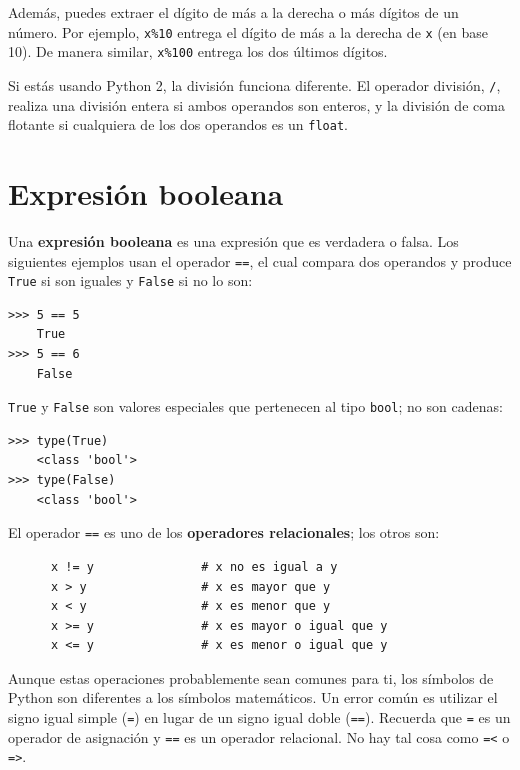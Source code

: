\documentclass[10pt]{book}
\begin{document}
Además, puedes extraer el dígito de más a la derecha
o más dígitos de un número.  Por ejemplo, {\tt x\%10} entrega el
dígito de más a la derecha de {\tt x} (en base 10).  De manera similar, {\tt x\%100}
entrega los dos últimos dígitos.

Si estás usando Python 2, la división funciona diferente.  El
operador división, \verb"/", realiza una división entera si ambos
operandos son enteros, y la división de coma flotante si cualquiera de
los dos operandos es un {\tt float}.


\section{Expresión booleana}

Una {\bf expresión booleana} es una expresión que es verdadera
o falsa.  Los siguientes ejemplos usan el
operador {\tt ==}, el cual compara dos operandos y produce
{\tt True} si son iguales y {\tt False} si no lo son:

\begin{verbatim}
>>> 5 == 5
    True
>>> 5 == 6
    False
\end{verbatim}
%
{\tt True} y {\tt False} son valores
especiales que pertenecen al tipo {\tt bool}; no son cadenas:

\begin{verbatim}
>>> type(True)
    <class 'bool'>
>>> type(False)
    <class 'bool'>
\end{verbatim}
%
El operador {\tt ==} es uno de los {\bf operadores relacionales}; los
otros son:

\begin{verbatim}
      x != y               # x no es igual a y
      x > y                # x es mayor que y
      x < y                # x es menor que y
      x >= y               # x es mayor o igual que y
      x <= y               # x es menor o igual que y
\end{verbatim}
%
Aunque estas operaciones probablemente sean comunes para ti, los símbolos de Python
son diferentes a los símbolos matemáticos.  Un error común
es utilizar el signo igual simple ({\tt =}) en lugar de un signo igual doble
({\tt ==}).  Recuerda que {\tt =} es un operador de asignación y
{\tt ==} es un operador relacional.   No hay tal cosa como
{\tt =<} o {\tt =>}.
\end{document}
